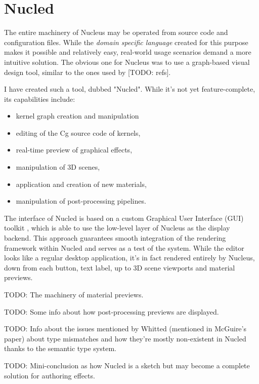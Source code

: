 
\chapter{ Nucled }
\label{Chapter5}

The entire machinery of Nucleus may be operated from source code and configuration files. While the \emph{ domain specific language } created for this purpose makes it possible and relatively easy, real-world usage scenarios demand a more intuitive solution. The obvious one for Nucleus was to use a graph-based visual design tool, similar to the ones used by [TODO: refs].

I have created such a tool, dubbed "Nucled". While it's not yet feature-complete, its capabilities include:

\begin{itemize}
\item kernel graph creation and manipulation
\item editing of the Cg source code of kernels,
\item real-time preview of graphical effects,
\item manipulation of 3D scenes,
\item application and creation of new materials,
\item manipulation of post-processing pipelines.
\end{itemize}

The interface of Nucled is based on a custom Graphical User Interface (GUI) toolkit \cite{HybridGUI}, which is able to use the low-level layer of Nucleus as the display backend. This approach guarantees smooth integration of the rendering framework within Nucled and serves as a test of the system. While the editor looks like a regular desktop application, it's in fact rendered entirely by Nucleus, down from each button, text label, up to 3D scene viewports and material previews.

TODO: The machinery of material previews.

TODO: Some info about how post-processing previews are displayed.

TODO: Info about the issues mentioned by Whitted (mentioned in McGuire's paper) about type mismatches and how they're mostly non-existent in Nucled thanks to the semantic type system.

TODO: Mini-conclusion as how Nucled is a sketch but may become a complete solution for authoring effects.
